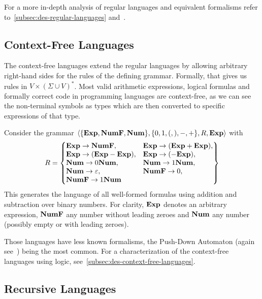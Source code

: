 For a more in-depth analysis of regular languages and equivalent formalisms refer to~\cref{subsec:des-regular-languages} and~\cite{Straubing1994}.

\subsection{Context-Free Languages}\label{subsec:context-free-languages}

The context-free languages extend the regular languages by allowing arbitrary right-hand sides for the rules of the defining grammar.
Formally, that gives us rules in $V\times(\Sigma \cup V)^{*}$.
Most valid arithmetic expressions, logical formulas and formally correct code in programming languages are context-free, as we can see the non-terminal symbols as types which are then converted to specific expressions of that type.

\begin{exmp}
    Consider the grammar $\langle \{\bold{Exp}, \bold{NumF}, \bold{Num}\}, \{0, 1, (, ), -, +\}, R, \bold{Exp} \rangle$ with
    \[
        R = \begin{Bmatrix*}[l]
                \bold{Exp} \to \bold{NumF},
                &\bold{Exp} \to (\bold{Exp} + \bold{Exp}), \\
                \bold{Exp} \to (\bold{Exp} - \bold{Exp}),
                &\bold{Exp} \to (-\bold{Exp}), \\
                \bold{Num} \to 0\bold{Num},
                &\bold{Num} \to 1\bold{Num}, \\
                \bold{Num} \to \varepsilon,
                &\bold{NumF} \to 0, \\
                \bold{NumF} \to 1\bold{Num}
        \end{Bmatrix*}
    \]
    This generates the language of all well-formed formulas using addition and subtraction over binary numbers.
    For clarity, $\bold{Exp}$ denotes an arbitrary expression, $\bold{NumF}$ any number without leading zeroes and $\bold{Num}$ any number (possibly empty or with leading zeroes).
\end{exmp}

Those languages have less known formalisms, the Push-Down Automaton (again see~\cite{theory-cs}) being the most common.
For a characterization of the context-free languages using logic, see~\cref{subsec:des-context-free-languages}.

\subsection{Recursive Languages}\label{subsec:recursive-languages}

